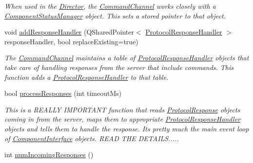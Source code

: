 \begin{DoxyCompactItemize}
\begin{DoxyCompactList}\small\item\em When used in the \hyperlink{class_director}{Director}, the \hyperlink{class_picto_1_1_command_channel}{Command\-Channel} works closely with a \hyperlink{class_component_status_manager}{Component\-Status\-Manager} object. This sets a stored pointer to that object. \end{DoxyCompactList}\item 
void \hyperlink{class_picto_1_1_command_channel_a42c88699a561e49f70b028122b9c60b1}{add\-Response\-Handler} (Q\-Shared\-Pointer$<$ \hyperlink{struct_picto_1_1_protocol_response_handler}{Protocol\-Response\-Handler} $>$ response\-Handler, bool replace\-Existing=true)
\begin{DoxyCompactList}\small\item\em The \hyperlink{class_picto_1_1_command_channel}{Command\-Channel} maintains a table of \hyperlink{struct_picto_1_1_protocol_response_handler}{Protocol\-Response\-Handler} objects that take care of handling responses from the server that include commands. This function adds a \hyperlink{struct_picto_1_1_protocol_response_handler}{Protocol\-Response\-Handler} to that table. \end{DoxyCompactList}\item 
bool \hyperlink{class_picto_1_1_command_channel_aafe619791fb542563544ecf50628238b}{process\-Responses} (int timeout\-Ms)
\begin{DoxyCompactList}\small\item\em This is a R\-E\-A\-L\-L\-Y I\-M\-P\-O\-R\-T\-A\-N\-T function that reads \hyperlink{struct_picto_1_1_protocol_response}{Protocol\-Response} objects coming in from the server, maps them to appropriate \hyperlink{struct_picto_1_1_protocol_response_handler}{Protocol\-Response\-Handler} objects and tells them to handle the response. Its pretty much the main event loop of \hyperlink{class_component_interface}{Component\-Interface} objects. R\-E\-A\-D T\-H\-E D\-E\-T\-A\-I\-L\-S..... \end{DoxyCompactList}\item 
\hypertarget{class_picto_1_1_command_channel_a1fa109c33aeb66291ba15979378fa0d5}{int \hyperlink{class_picto_1_1_command_channel_a1fa109c33aeb66291ba15979378fa0d5}{num\-Incoming\-Responses} ()}\label{class_picto_1_1_command_channel_a1fa109c33aeb66291ba15979378fa0d5}


\end{DoxyCompactItemize}
